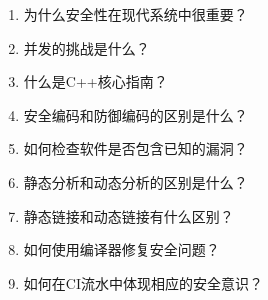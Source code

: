 \begin{enumerate}
\item
为什么安全性在现代系统中很重要？

\item
并发的挑战是什么？

\item
什么是C++核心指南？

\item
安全编码和防御编码的区别是什么？

\item
如何检查软件是否包含已知的漏洞？

\item
静态分析和动态分析的区别是什么？

\item
静态链接和动态链接有什么区别？

\item
如何使用编译器修复安全问题？

\item
如何在CI流水中体现相应的安全意识？
\end{enumerate}